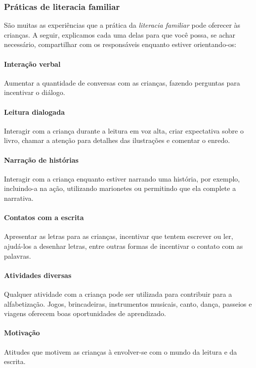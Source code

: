 \documentclass[11pt]{extarticle}
\begin{document}
\subsubsection{Práticas de literacia familiar} 

São muitas as experiências que a prática da \textit{literacia familiar} 
pode oferecer às crianças. A seguir, explicamos cada uma delas para que você possa, 
se achar necessário, compartilhar com os responsáveis enquanto estiver orientando-os: 

\paragraph{Interação verbal} Aumentar a quantidade de conversas com as 
crianças, fazendo perguntas para incentivar o diálogo.

\paragraph{Leitura dialogada} Interagir com a criança durante a leitura 
em voz alta, criar expectativa sobre o livro, chamar a atenção para detalhes 
das ilustrações e comentar o enredo.

\paragraph{Narração de histórias} Interagir com a criança enquanto 
estiver narrando uma história, por exemplo, incluindo-a na ação, utilizando 
marionetes ou permitindo que ela complete a narrativa.

\paragraph{Contatos com a escrita} Apresentar as letras para as 
crianças, incentivar que tentem escrever ou ler, ajudá-los a desenhar letras, 
entre outras formas de incentivar o contato com as palavras.

\paragraph{Atividades diversas} Qualquer atividade com a criança 
pode ser utilizada para contribuir para a alfabetização. Jogos, brincadeiras, 
instrumentos musicais, canto, dança, passeios e viagens oferecem boas 
oportunidades de aprendizado.

\paragraph{Motivação} Atitudes que motivem as crianças à envolver-se com 
o mundo da leitura e da escrita.
\end{document}
